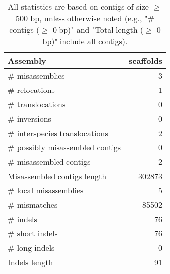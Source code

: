 \documentclass[12pt,a4paper]{article}
\begin{document}
\begin{table}[ht]
\begin{center}
\caption{All statistics are based on contigs of size $\geq$ 500 bp, unless otherwise noted (e.g., "\# contigs ($\geq$ 0 bp)" and "Total length ($\geq$ 0 bp)" include all contigs).}
\begin{tabular}{|l*{1}{|r}|}
\hline
Assembly & scaffolds \\ \hline
\# misassemblies & 3 \\ \hline
\hspace{5mm}\# relocations & 1 \\ \hline
\hspace{5mm}\# translocations & 0 \\ \hline
\hspace{5mm}\# inversions & 0 \\ \hline
\hspace{5mm}\# interspecies translocations & 2 \\ \hline
\# possibly misassembled contigs & 0 \\ \hline
\# misassembled contigs & 2 \\ \hline
Misassembled contigs length & 302873 \\ \hline
\# local misassemblies & 5 \\ \hline
\# mismatches & 85502 \\ \hline
\# indels & 76 \\ \hline
\hspace{5mm}\# short indels & 76 \\ \hline
\hspace{5mm}\# long indels & 0 \\ \hline
Indels length & 91 \\ \hline
\end{tabular}
\end{center}
\end{table}
\end{document}
